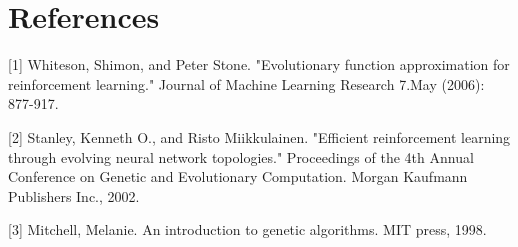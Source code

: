 \documentclass{article}
\begin{document}
\section*{References}

\small

[1] Whiteson, Shimon, and Peter Stone. "Evolutionary function approximation for reinforcement learning." Journal of Machine Learning Research 7.May (2006): 877-917.

[2] Stanley, Kenneth O., and Risto Miikkulainen. "Efficient reinforcement learning through evolving neural network topologies." Proceedings of the 4th Annual Conference on Genetic and Evolutionary Computation. Morgan Kaufmann Publishers Inc., 2002.

[3] Mitchell, Melanie. An introduction to genetic algorithms. MIT press, 1998.
\end{document}
